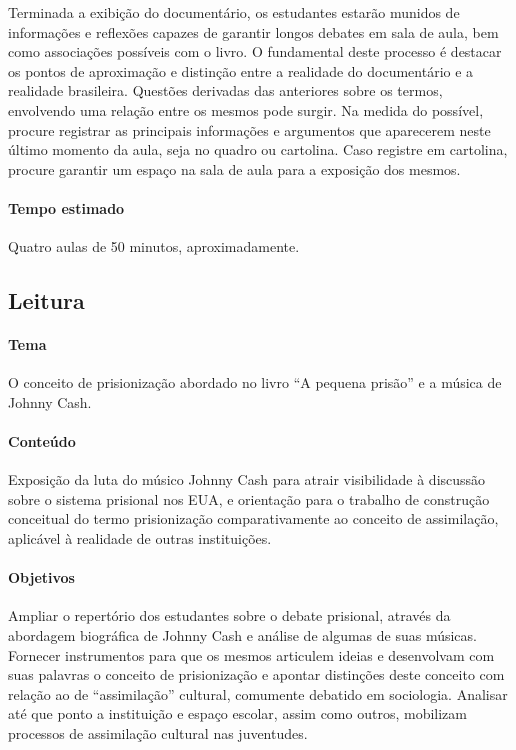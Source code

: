 \documentclass[11pt]{extarticle}
\begin{document}
Terminada a exibição do documentário, os estudantes estarão munidos de
informações e reflexões capazes de garantir longos debates em sala de
aula, bem como associações possíveis com o livro. O fundamental deste
processo é destacar os pontos de aproximação e distinção entre a
realidade do documentário e a realidade brasileira. Questões derivadas
das anteriores sobre os termos, envolvendo uma relação entre os mesmos
pode surgir. Na medida do possível, procure registrar as principais
informações e argumentos que aparecerem neste último momento da aula,
seja no quadro ou cartolina. Caso registre em cartolina, procure
garantir um espaço na sala de aula para a exposição dos mesmos.


\paragraph{Tempo estimado} Quatro aulas de 50 minutos, aproximadamente.

\subsection{Leitura}

\paragraph{Tema} O conceito de prisionização abordado no livro ``A pequena
prisão'' e a música de Johnny Cash.

\paragraph{Conteúdo} Exposição da luta do músico Johnny Cash para atrair
visibilidade à discussão sobre o sistema prisional nos EUA, e orientação
para o trabalho de construção conceitual do termo prisionização
comparativamente ao conceito de assimilação, aplicável à realidade de
outras instituições.

\paragraph{Objetivos} Ampliar o repertório dos estudantes sobre o debate
prisional, através da abordagem biográfica de Johnny Cash e análise de
algumas de suas músicas. Fornecer instrumentos para que os mesmos
articulem ideias e desenvolvam com suas palavras o conceito de
prisionização e apontar distinções deste conceito com relação ao de
``assimilação'' cultural, comumente debatido em sociologia. Analisar até
que ponto a instituição e espaço escolar, assim como outros, mobilizam
processos de assimilação cultural nas juventudes.
\end{document}
